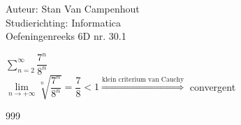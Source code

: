 \documentclass[a4paper]{article}
\begin{document}
  
\noindent \large Auteur: Stan Van Campenhout \\
\noindent \large Studierichting:  Informatica\\
\noindent \large Oefeningenreeks 6D nr. 30.1\\

\medskip

\normalsize

$ \displaystyle\sum\limits_{n = 2}^\infty\dfrac{7^n}{8^n} $\\

$ \lim\limits_{n\rightarrow+\infty}\sqrt[n]{\dfrac{7^n}{8^n}} = \dfrac{7}{8} < 1 \stackrel{\text{klein criterium van Cauchy}}{\Rightarrow} $ convergent \\

\begin{thebibliography}{999}
\end{thebibliography}
\end{document}
